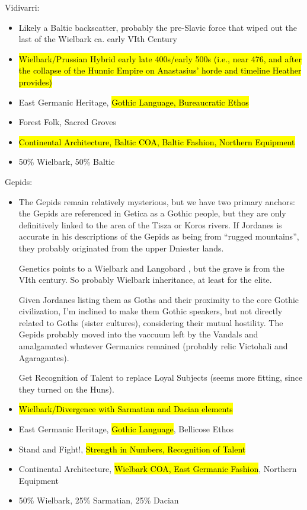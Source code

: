 \documentclass{article}
\begin{document}
	Vidivarri:
	\begin{itemize}
		\item Likely a Baltic backscatter, probably the pre-Slavic force that wiped out the last of the Wielbark ca. early VIth Century \cite{Vidivarii}
		\item \hl{Wielbark/Prussian Hybrid early late 400s/early 500s (i.e., near 476, and after the collapse of the Hunnic Empire on Anastasius’ horde and timeline Heather provides)} \cite{Vidivarii,HeatherEmpiresAndBarbarians}
		\item East Germanic Heritage, \hl{Gothic Language, Bureaucratic Ethos}
		\item Forest Folk, Sacred Groves
		\item \hl{Continental Architecture, Baltic COA, Baltic Fashion, Northern Equipment}
		\item 50\% Wielbark, 50\% Baltic
	\end{itemize}
	
	Gepids:
	\begin{itemize}
		\item The Gepids remain relatively mysterious, but we have two primary anchors:  the Gepids are referenced in Getica as a Gothic people, but they are only definitively linked to the area of the Tisza or Koros rivers. If Jordanes is accurate in his descriptions of the Gepids as being from “rugged mountains”, they probably originated from the upper Dniester lands.
		
		Genetics points to a Wielbark and Langobard \cite{GepidGenetics}, but the grave is from the VIth century. So probably Wielbark inheritance, at least for the elite.
		
		Given Jordanes listing them as Goths and their proximity to the core Gothic civilization, I’m inclined to make them Gothic speakers, but not directly related to Goths (sister cultures), considering their mutual hostility. The Gepids probably moved into the vaccuum left by the Vandals and amalgamated whatever Germanics remained (probably relic Victohali and Agaragantes).
		
		Get Recognition of Talent to replace Loyal Subjects (seems more fitting, since they turned on the Huns).
		\item \hl{Wielbark/Divergence with Sarmatian and Dacian elements}
		\item East Germanic Heritage, \hl{Gothic Language}, Bellicose Ethos
		\item Stand and Fight!, \hl{Strength in Numbers, Recognition of Talent}
		\item Continental Architecture, \hl{Wielbark COA, East Germanic Fashion}, Northern Equipment
		\item 50\% Wielbark, 25\% Sarmatian, 25\% Dacian
	\end{itemize}
	
\end{document}
